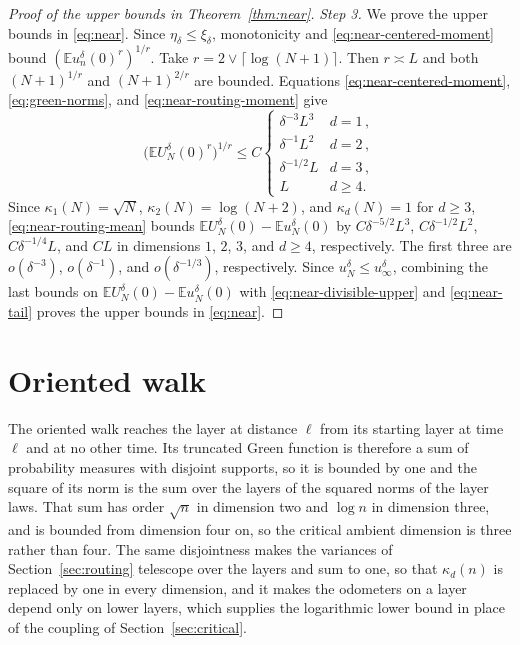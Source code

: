 \documentclass[11pt]{amsart}
\theoremstyle{plain}
\theoremstyle{definition}
\newcommand{\E}{\mathbb{E}}
\begin{document}
\begin{proof}[Proof of the upper bounds in Theorem~\ref{thm:near}]
	\smallskip
	\noindent\emph{Step 3.} We prove the upper bounds in \eqref{eq:near}.
	Since $\eta_\delta\leq\xi_\delta$, monotonicity and
	\eqref{eq:near-centered-moment} bound $(\E u_n^\delta(0)^r)^{1/r}$. Take
	$r=2\vee\lceil\log(N+1)\rceil$. Then $r\asymp L$ and both
	$(N+1)^{1/r}$ and $(N+1)^{2/r}$ are bounded. Equations
	\eqref{eq:near-centered-moment}, \eqref{eq:green-norms}, and
	\eqref{eq:near-routing-moment} give
	\[
		\bigl(\E U_N^\delta(0)^r\bigr)^{1/r}\leq C
		\begin{cases}
			\delta^{-3}L^3&d=1\,,\\
			\delta^{-1}L^2&d=2\,,\\
			\delta^{-1/2}L&d=3\,,\\
			L&d\geq4.
		\end{cases}
	\]
	Since $\kappa_1(N)=\sqrt N$, $\kappa_2(N)=\log(N+2)$, and
	$\kappa_d(N)=1$ for $d\geq3$, \eqref{eq:near-routing-mean} bounds
	$\E U_N^\delta(0)-\E u_N^\delta(0)$ by
	$C\delta^{-5/2}L^3$, $C\delta^{-1/2}L^2$, $C\delta^{-1/4}L$, and $CL$
	in dimensions $1$, $2$, $3$, and $d\geq4$, respectively. The first
	three are $o(\delta^{-3})$, $o(\delta^{-1})$, and
	$o(\delta^{-1/3})$, respectively. Since $u_N^\delta\leq u_\infty^\delta$, combining the last bounds on $\E U_N^\delta(0)-\E u_N^\delta(0)$
	with \eqref{eq:near-divisible-upper} and \eqref{eq:near-tail} proves the
	upper bounds in \eqref{eq:near}.
\end{proof}

\section{Oriented walk}\label{sec:oriented}

The oriented walk reaches the layer at distance $\ell$ from its starting layer
at time $\ell$ and at no other time. Its truncated Green function is therefore
a sum of probability measures with disjoint supports, so it is bounded by one
and the square of its norm is the sum over the layers of the squared norms of
the layer laws. That sum has order $\sqrt n$ in dimension two and $\log n$ in
dimension three, and is bounded from dimension four on, so the critical
ambient dimension is three rather than four. The same disjointness makes the
variances of Section~\ref{sec:routing} telescope over the layers and sum to
one, so that $\kappa_d(n)$ is replaced by one in every dimension, and it makes
the odometers on a layer depend only on lower layers, which supplies the
logarithmic lower bound in place of the coupling of
Section~\ref{sec:critical}.
\end{document}
